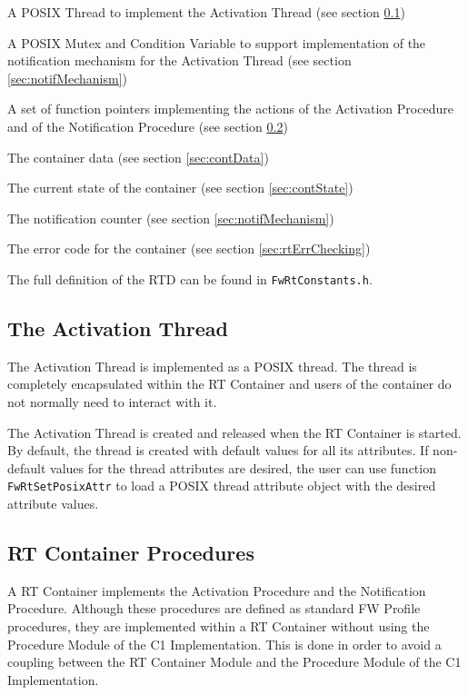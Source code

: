 \documentclass[manual]{../fwprofile}
\begin{document}
\begin{fw_itemize}
\item A POSIX Thread to implement the Activation Thread (see section \ref{sec:activThread})
\item A POSIX Mutex and Condition Variable to support implementation of the notification mechanism for the Activation Thread (see section \ref{sec:notifMechanism})
\item A set of function pointers implementing the actions of the Activation Procedure and of the Notification Procedure (see section \ref{sec:contProc})
\item The container data (see section \ref{sec:contData})
\item The current state of the container (see section \ref{sec:contState})
\item The notification counter (see section \ref{sec:notifMechanism})
\item The error code for the container (see section \ref{sec:rtErrChecking})
\end{fw_itemize} 

The full definition of the RTD can be found in \texttt{FwRtConstants.h}.

\subsection{The Activation Thread}\label{sec:activThread}
The Activation Thread is implemented as a POSIX thread. The thread is completely encapsulated within the RT Container and users of the container do not normally need to interact with it.

The Activation Thread is created and released when the RT Container is started. By default, the thread is created with default values for all its attributes. If non-default values for the thread attributes are desired, the user can use function \texttt{FwRtSetPosixAttr} to load a POSIX thread attribute object with the desired attribute values. 

\subsection{RT Container Procedures}\label{sec:contProc}
A RT Container implements the Activation Procedure and the Notification Procedure. Although these procedures are defined as standard FW Profile procedures, they are implemented within a RT Container without using the Procedure Module of the C1 Implementation. This is done in order to avoid a coupling between the RT Container Module and the Procedure Module of the C1 Implementation. 
\end{document}
